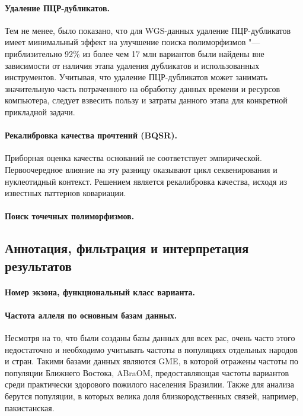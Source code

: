 \documentclass[a4paper,12pt]{article}
\begin{document}
\paragraph{Удаление ПЦР-дубликатов.}
Тем не менее, было показано, что для WGS-данных удаление ПЦР-дубликатов имеет минимальный эффект на улучшение поиска полиморфизмов "--- приблизительно 92\% из более чем 17 млн вариантов были найдены вне зависимости от наличия этапа удаления дубликатов и использованных инструментов\cite{ebbert}.
Учитывая, что удаление ПЦР-дубликатов может занимать значительную часть потраченного на обработку данных времени и ресурсов компьютера, следует взвесить пользу и затраты данного этапа для конкретной прикладной задачи.

\paragraph{Рекалибровка качества прочтений (BQSR).}
Приборная оценка качества оснований не соответствует эмпирической.
Первоочередное влияние на эту разницу оказывают цикл секвенирования и нуклеотидный контекст.
Решением является рекалибровка качества, исходя из известных паттернов ковариации.

\paragraph{Поиск точечных полиморфизмов.}

\subsection{Аннотация, фильтрация и интерпретация результатов}

\paragraph{Номер экзона, функциональный класс варианта.}

\paragraph{Частота аллеля по основным базам данных.}
Несмотря на то, что были созданы базы данных для всех рас, очень часто этого недостаточно и необходимо учитывать частоты в популяциях отдельных народов и стран.
Такими базами данных являются GME\cite{gme}, в которой отражены частоты по популяции Ближнего Востока, ABraOM\cite{abraom}, предоставляющая частоты вариантов среди практически здорового пожилого населения Бразилии.
Также для анализа берутся популяции, в которых велика доля близкородственных связей, например, пакистанская\cite{saleheen}.
\end{document}
